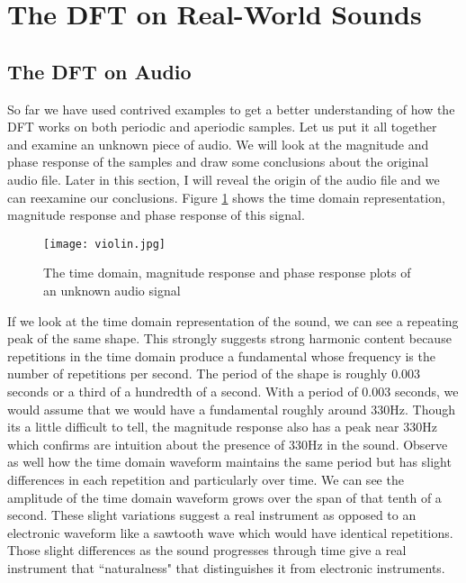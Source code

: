 \section*{The DFT on Real-World Sounds}

\subsection*{The DFT on Audio}

So far we have used contrived examples to get a better understanding of how the DFT works on both periodic and
aperiodic samples.  Let us put it all together and examine an unknown piece of audio.  We will look at the magnitude
and phase response of the samples and draw some conclusions about the original audio file.  Later in this section, I
will reveal the origin of the audio file and we can reexamine our conclusions.  Figure \ref{fig:unknown} shows the 
time domain representation, magnitude response and phase response of this signal.

\begin{figure}[h]
	\caption{The time domain, magnitude response and phase response plots of an unknown audio signal}
	\label{fig:unknown}
	\begin{center}
		\texttt{[image: violin.jpg]}
	\end{center}
\end{figure}

If we look at the time domain representation of the sound, we can see a repeating peak of the same shape.  This
strongly suggests strong harmonic content because repetitions in the time domain produce a fundamental whose
frequency is the number of repetitions per second.  The period of the shape is roughly 0.003 seconds or a third of
a hundredth of a second.  With a period of 0.003 seconds, we would assume that we would have a fundamental
roughly around 330Hz.  Though its a little difficult to tell, the magnitude response also has a peak near 330Hz
which confirms are intuition about the presence of 330Hz in the sound.  Observe as well how the time domain
waveform maintains the same period but has slight differences in each repetition and particularly over time.  We
can see the amplitude of the time domain waveform grows over the span of that tenth of a second.  These
slight variations suggest a real instrument as opposed to an electronic waveform like a sawtooth wave which
would have identical repetitions.  Those slight differences as the sound progresses through time give a real
instrument that ``naturalness" that distinguishes it from electronic instruments.

